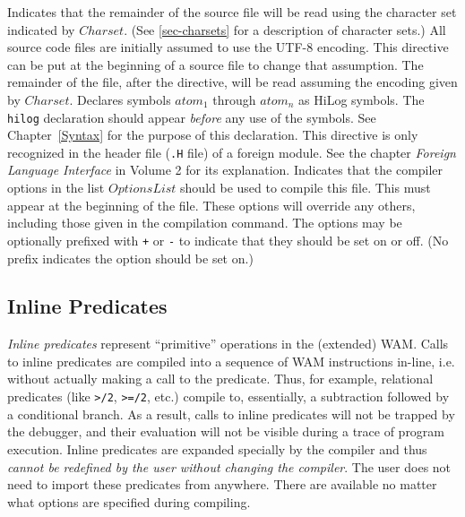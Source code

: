 \begin{description}
        Indicates that the remainder of the source file will be read
        using the character set indicated by $Charset$.
        (See \ref{sec-charsets} for a description of character sets.)
        All source code files are initially assumed
        to use the UTF-8 encoding.  This directive can be put at the
        beginning of a source file to change that assumption.  The remainder
        of the file, after the directive, will be read assuming the
        encoding given by $Charset$.
	Declares symbols $atom_1$ through $atom_n$ as HiLog symbols.
	The {\tt hilog} declaration should appear {\em before} any use of
	the symbols.  See Chapter~\ref{Syntax} for the purpose of this
 	declaration.
        This directive is only recognized in the header file ({\tt .H} file) 
	of a foreign module. See the chapter {\it Foreign Language
Interface} in Volume 2 for its explanation.
	Indicates that the compiler options in the list $OptionsList$
	should be used to compile this file.  This must appear at the
	beginning of the file.  These options will override any others,
	including those given in the compilation command.  The options
	may be optionally prefixed with \verb|+| or \verb|-| to
	indicate that they should be set on or off.  (No prefix
	indicates the option should be set on.)

\end{description}

\subsection{Inline Predicates}\label{inline_predicates}

{\em Inline predicates} represent ``primitive'' operations in the
(extended) WAM.  Calls to inline predicates are compiled into a
sequence of WAM instructions in-line, i.e. without actually making a
call to the predicate.  Thus, for example, relational predicates (like
{\tt >/2}, {\tt >=/2}, etc.) compile to, essentially, a subtraction
followed by a conditional branch.  As a result, calls to inline
predicates will not be trapped by the debugger, and their evaluation
will not be visible during a trace of program execution.  Inline
predicates are expanded specially by the compiler and thus {\em cannot
  be redefined by the user without changing the compiler}.  The user
does not need to import these predicates from anywhere.  There are
available no matter what options are specified during compiling.

